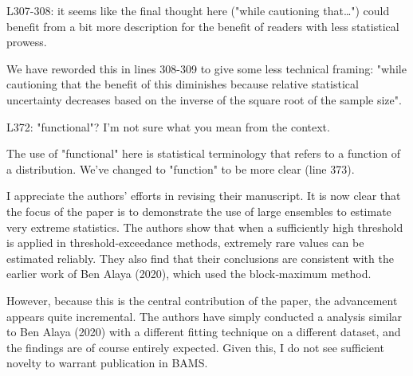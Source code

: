 \documentclass[12pt,english]{reviewresponse}
\begin{document}
\begin{revcomment}
   L307-308: it seems like the final thought here ("while cautioning that…") could benefit from a bit more description for the benefit of readers with less statistical prowess.
\end{revcomment}

\begin{revresponse}
We have reworded this in lines 308-309 to give some less technical framing: "while cautioning that the benefit of this diminishes because relative statistical uncertainty decreases based on the inverse of the square root of the sample size".

\end{revresponse}

\begin{revcomment}
   L372: "functional"? I'm not sure what you mean from the context.
\end{revcomment}

\begin{revresponse}

The use of "functional" here is statistical terminology that refers to a function of a distribution. We've changed to "function" to be more clear (line 373).

\end{revresponse}

\reviewer 
\begin{revcomment}
I appreciate the authors' efforts in revising their manuscript. It is now clear that the focus of the paper is to demonstrate the use of large ensembles to estimate very extreme statistics. The authors show that when a sufficiently high threshold is applied in threshold‑exceedance methods, extremely rare values can be estimated reliably. They also find that their conclusions are consistent with the earlier work of Ben Alaya (2020), which used the block‑maximum method.

However, because this is the central contribution of the paper, the advancement appears quite incremental. The authors have simply conducted a analysis similar to Ben Alaya (2020) with a different fitting technique on a different dataset, and the findings are of course entirely expected. Given this, I do not see sufficient novelty to warrant publication in BAMS.
   
\end{revcomment}
\end{document}
